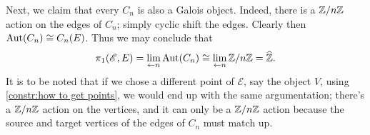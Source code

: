 Next, we claim that every $C_n$ is also a Galois object. Indeed, there is a $\mathbb{Z}/n\mathbb{Z}$ action on the edges of $C_n$; simply cyclic shift the edges. Clearly then $\operatorname{Aut}(C_n) \cong C_n(E)$.
Thus we may conclude that
\[ \pi_1(\mathscr{E}, E) = \lim_{\leftarrow n} \operatorname{Aut}(C_n) \cong \lim_{\leftarrow n} \mathbb{Z}/n\mathbb{Z} = \widehat{\mathbb{Z}}. \]
It is to be noted that if we chose a different point of $\mathscr{E}$, say the object $V$, using \cref{constr:how to get points}, we would end up with the same argumentation; there's a  $\mathbb{Z}/n\mathbb{Z}$ action on the vertices, and it can only be a $\mathbb{Z}/n\mathbb{Z}$ action because the source and target vertices of the edges of $C_n$ must match up.



